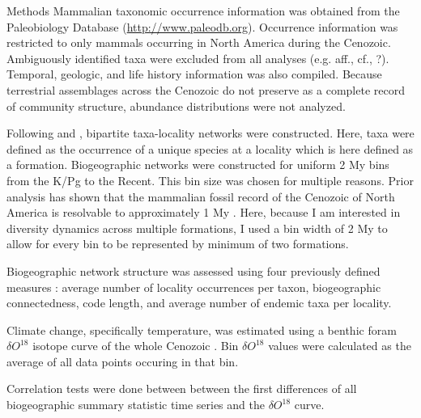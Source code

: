\documentclass[final]{beamer}\usepackage[]{graphicx}\usepackage[]{color}
\newlength{\onecolwid}
\begin{document}
\begin{frame}[t]
\begin{columns}[t]
\begin{column}{\onecolwid}
      \begin{footnotesize}
      \begin{block}{Methods}
        Mammalian taxonomic occurrence information was obtained from the Paleobiology Database (\url{http://www.paleodb.org}). Occurrence information was restricted to only mammals occurring in North America during the Cenozoic. Ambiguously identified taxa were excluded from all analyses (e.g. aff., cf., ?). Temporal, geologic, and life history information was also compiled. Because terrestrial assemblages across the Cenozoic do not preserve as a complete record of community structure, abundance distributions were not analyzed.

        Following \citet{Sidor2013} and \citet{Vilhena2013}, bipartite taxa-locality networks were constructed. Here, taxa were defined as the occurrence of a unique species at a locality which is here defined as a formation. Biogeographic networks were constructed for uniform 2 My bins from the K/Pg to the Recent. This bin size was chosen for multiple reasons. Prior analysis has shown that the mammalian fossil record of the Cenozoic of North America is resolvable to approximately 1 My \citep{Alroy1996a,Alroy2000g}. Here, because I am interested in diversity dynamics across multiple formations, I used a bin width of 2 My to allow for every bin to be represented by minimum of two formations.

        Biogeographic network structure was assessed using four previously defined measures \citep{Sidor2013}: average number of locality occurrences per taxon, biogeographic connectedness, code length, and average number of endemic taxa per locality. 

        Climate change, specifically temperature, was estimated using a benthic foram \(\delta O^{18}\) isotope curve of the whole Cenozoic \citep{Zachos2008}. Bin \(\delta O^{18}\) values were calculated as the average of all data points occuring in that bin.

        Correlation tests were done between between the first differences of all biogeographic summary statistic time series and the \(\delta O^{18}\) curve. 

      \end{block}
      \end{footnotesize}

    \end{column}


\end{columns}
\end{frame}
\end{document}
